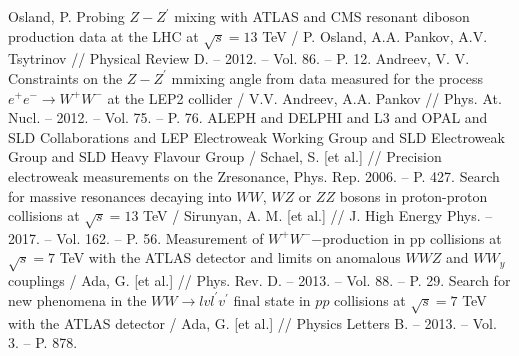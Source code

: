 	Osland, P. Probing $Z-Z^\prime$ mixing with ATLAS and CMS resonant diboson production data at the LHC at $\sqrt{s}=13$ TeV
	/ P. Osland, A.A. Pankov, A.V. Tsytrinov 
	// Physical Review D. – 2012. – Vol. 86. – P. 12.
	Andreev, V. V. Constraints on the $Z-Z^\prime$ mmixing angle from data measured for the process $e^+e^- \rightarrow W^+W^-$ at the LEP2 collider
	/ V.V. Andreev, A.A. Pankov
	// Phys. At. Nucl. – 2012. – Vol. 75. – P. 76.
	ALEPH and DELPHI and L3 and OPAL and SLD Collaborations and LEP Electroweak Working Group and SLD Electroweak Group and SLD Heavy Flavour Group
	/ Schael, S. [et al.] 
	// Precision electroweak measurements on the Zresonance, Phys. Rep. 2006. – P. 427.
	Search for massive resonances decaying into $WW$, $WZ$ or $ZZ$ bosons in proton-proton collisions at $\sqrt{s}=13$ TeV
	/ Sirunyan, A. M. [et al.] 
	// J. High Energy Phys. – 2017. – Vol. 162. – P. 56.
	Measurement of $W^+W^-$−production in pp collisions at $\sqrt{s}=7$ TeV with the ATLAS detector and limits on anomalous $WWZ$ and $WW_y$ couplings
	/ Ada, G. [et al.] 
	// Phys. Rev. D. – 2013. – Vol. 88. – P. 29.
	Search for new phenomena in the $WW \rightarrow lvl^{\prime}v^{\prime}$ final state in $pp$ collisions at $\sqrt{s}=7$ TeV with the ATLAS detector
	/ Ada, G. [et al.] 
	// Physics Letters B. – 2013. – Vol. 3. – P. 878.
	




